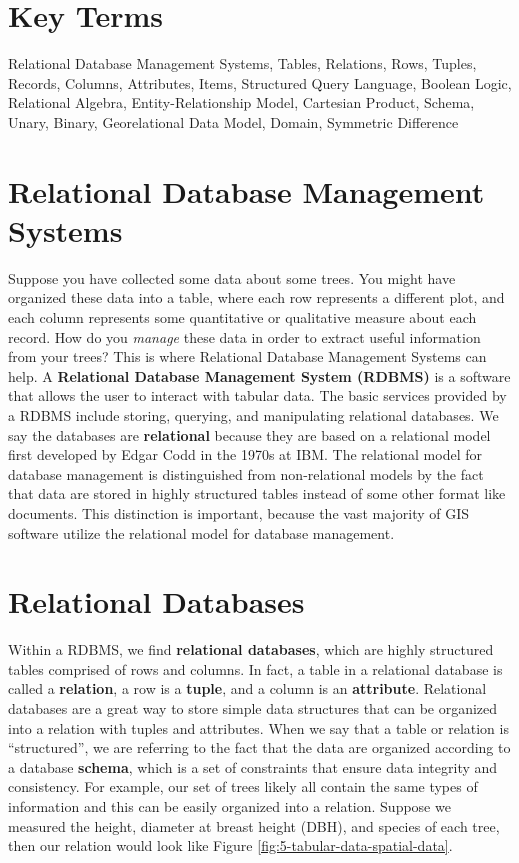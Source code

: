 \documentclass[
]{book}
\begin{document}
\section*{Key Terms}\label{key-terms-4}

Relational Database Management Systems, Tables, Relations, Rows, Tuples, Records, Columns, Attributes, Items, Structured Query Language, Boolean Logic, Relational Algebra, Entity-Relationship Model, Cartesian Product, Schema, Unary, Binary, Georelational Data Model, Domain, Symmetric Difference

\section{Relational Database Management Systems}\label{relational-database-management-systems}

Suppose you have collected some data about some trees. You might have organized these data into a table, where each row represents a different plot, and each column represents some quantitative or qualitative measure about each record. How do you \emph{manage} these data in order to extract useful information from your trees? This is where Relational Database Management Systems can help. A \textbf{Relational Database Management System (RDBMS)} is a software that allows the user to interact with tabular data. The basic services provided by a RDBMS include storing, querying, and manipulating relational databases. We say the databases are \textbf{relational} because they are based on a relational model first developed by Edgar Codd in the 1970s at IBM. The relational model for database management is distinguished from non-relational models by the fact that data are stored in highly structured tables instead of some other format like documents. This distinction is important, because the vast majority of GIS software utilize the relational model for database management.

\section{Relational Databases}\label{relational-databases-1}

Within a RDBMS, we find \textbf{relational databases}, which are highly structured tables comprised of rows and columns. In fact, a table in a relational database is called a \textbf{relation}, a row is a \textbf{tuple}, and a column is an \textbf{attribute}. Relational databases are a great way to store simple data structures that can be organized into a relation with tuples and attributes. When we say that a table or relation is ``structured'', we are referring to the fact that the data are organized according to a database \textbf{schema}, which is a set of constraints that ensure data integrity and consistency. For example, our set of trees likely all contain the same types of information and this can be easily organized into a relation. Suppose we measured the height, diameter at breast height (DBH), and species of each tree, then our relation would look like Figure \ref{fig:5-tabular-data-spatial-data}.
\end{document}
